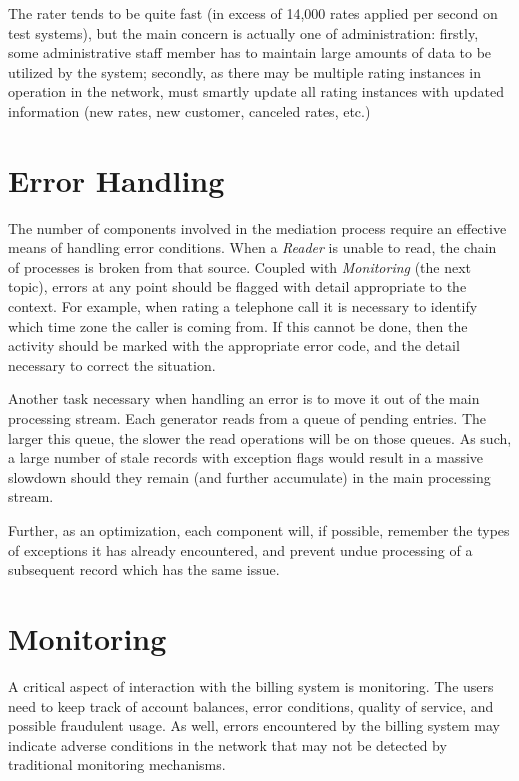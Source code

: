 		The rater tends to be quite fast (in excess of 14,000 rates applied per
		second on test systems), but the main concern is actually one of
		administration: firstly, some administrative staff member has to maintain
		large amounts of data to be utilized by the system; secondly, as there may
		be multiple rating instances in operation in the network, \XCDR{} must
		smartly update all rating instances with updated information (new rates,
		new customer, canceled rates, etc.)

	\section{Error Handling}
		The number of components involved in the mediation process require
		an effective means of handling error conditions. When a \emph{Reader} is
		unable to read, the chain of processes is broken from that source. Coupled
		with \emph{Monitoring} (the next topic), errors at any point should be
		flagged with detail appropriate to the context. For example, when rating
		a telephone call it is necessary to identify which time zone the caller
		is coming from. If this cannot be done, then the activity should be marked
		with the appropriate error code, and the detail necessary to correct
		the situation.

		Another task necessary when handling an error is to move it out of the
		main processing stream. Each generator reads from a queue of pending
		entries. The larger this queue, the slower the read operations will be
		on those queues. As such, a large number of stale records with exception
		flags would result in a massive slowdown should they remain (and further
		accumulate) in the main processing stream.

		Further, as an optimization, each component will, if possible, remember
		the types of exceptions it has already encountered, and prevent undue
		processing of a subsequent record which has the same issue.

	\section{Monitoring}
		A critical aspect of interaction with the billing system is monitoring.
		The users need to keep track of account balances, error conditions,
		quality of service, and possible fraudulent usage. As well, errors
		encountered by the billing system may indicate adverse conditions
		in the network that may not be detected by traditional monitoring
		mechanisms.

